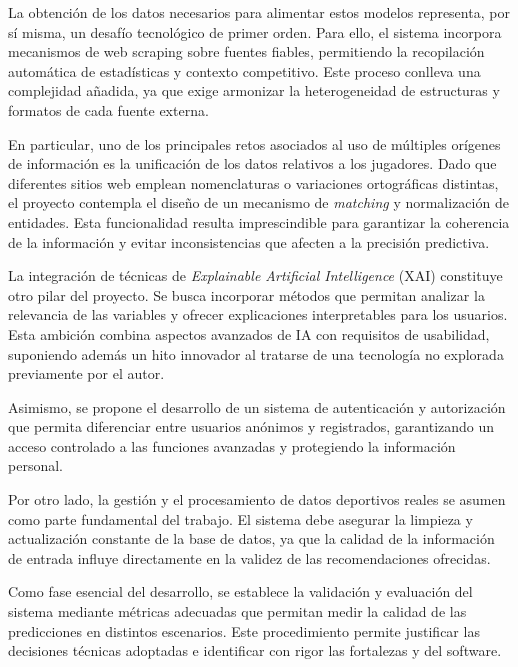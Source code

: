 La obtención de los datos necesarios para alimentar estos modelos representa, por sí misma, un desafío 
tecnológico de primer orden. Para ello, el sistema incorpora mecanismos de web scraping sobre fuentes fiables,
 permitiendo la recopilación automática de estadísticas y contexto competitivo. Este proceso conlleva una
  complejidad añadida, ya que exige armonizar la heterogeneidad de estructuras y formatos de cada fuente 
  externa.

En particular, uno de los principales retos asociados al uso de múltiples orígenes de información es la
unificación de los datos relativos a los jugadores. Dado que diferentes sitios web emplean nomenclaturas
 o variaciones ortográficas distintas, el proyecto contempla el diseño de un mecanismo de \textit{matching} y 
 normalización de entidades. Esta funcionalidad resulta imprescindible para garantizar la coherencia
  de la información y evitar inconsistencias que afecten a la precisión predictiva.

La integración de técnicas de \textit{Explainable Artificial Intelligence} (XAI) constituye otro pilar del proyecto. Se busca incorporar métodos que permitan analizar la relevancia de las variables y ofrecer
  explicaciones interpretables para los usuarios. Esta ambición combina aspectos avanzados de IA con requisitos
   de usabilidad, suponiendo además un hito innovador al tratarse de una tecnología no explorada previamente
    por el autor.

Asimismo, se propone el desarrollo de un sistema de autenticación y autorización que permita diferenciar 
entre usuarios anónimos y registrados, garantizando un acceso controlado a las funciones avanzadas y 
protegiendo la información personal.

Por otro lado, la gestión y el procesamiento de datos deportivos reales se asumen como parte fundamental
del trabajo. El sistema debe asegurar la limpieza y actualización constante de la base de datos,
 ya que la calidad de la información de entrada influye directamente en la validez de las recomendaciones 
 ofrecidas.

Como fase esencial del desarrollo, se establece la validación y evaluación del sistema mediante métricas 
adecuadas que permitan medir la calidad de las predicciones en distintos escenarios. Este procedimiento 
permite justificar las decisiones técnicas adoptadas e identificar con rigor las fortalezas y 
 del software.

